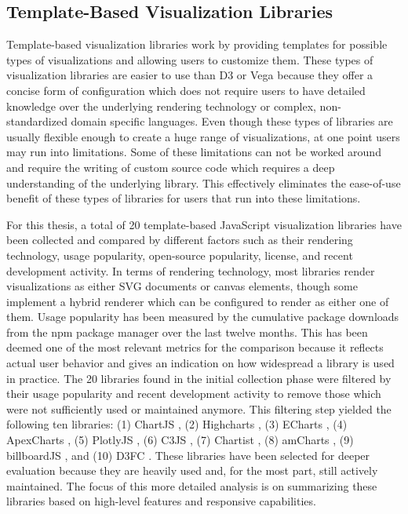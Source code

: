 \subsection{Template-Based Visualization Libraries}

Template-based visualization libraries work by providing templates for
possible types of visualizations and allowing users to customize them.
These types of visualization libraries are easier to use than D3 or
Vega because they offer a concise form of configuration which does not
require users to have detailed knowledge over the underlying rendering
technology or complex, non-standardized domain specific languages.
Even though these types of libraries are usually flexible enough to
create a huge range of visualizations, at one point users may run into
limitations.  Some of these limitations can not be worked around and
require the writing of custom source code which requires a deep
understanding of the underlying library.  This effectively eliminates
the ease-of-use benefit of these types of libraries for users that run
into these limitations.

For this thesis, a total of 20 template-based JavaScript visualization
libraries have been collected and compared by different factors such
as their rendering technology, usage popularity, open-source
popularity, license, and recent development activity.  In terms of
rendering technology, most libraries render visualizations as either
SVG documents or canvas elements, though some implement a hybrid
renderer which can be configured to render as either one of them.
Usage popularity has been measured by the cumulative package downloads
from the npm package manager over the last twelve months.  This has
been deemed one of the most relevant metrics for the comparison
because it reflects actual user behavior and gives an indication on
how widespread a library is used in practice.  The 20 libraries found
in the initial collection phase were filtered by their usage
popularity and recent development activity to remove those which were
not sufficiently used or maintained anymore.  This filtering step
yielded the following ten libraries: (1) ChartJS \parencite{ChartJS},
(2) Highcharts \parencite{Highcharts}, (3) ECharts
\parencite{ECharts}, (4) ApexCharts \parencite{ApexCharts}, (5)
PlotlyJS \parencite{PlotlyJS}, (6) C3JS \parencite{C3JS}, (7) Chartist
\parencite{Chartist}, (8) amCharts \parencite{amCharts}, (9)
billboardJS \parencite{billboardJS}, and (10) D3FC \parencite{D3FC}.
These libraries have been selected for deeper evaluation because they
are heavily used and, for the most part, still actively maintained.
The focus of this more detailed analysis is on summarizing these
libraries based on high-level features and responsive capabilities.

